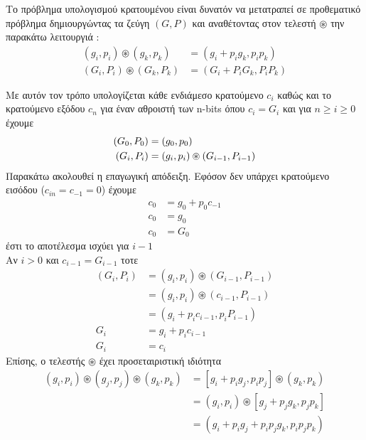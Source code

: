 Το πρόβλημα υπολογισμού κρατουμένου είναι δυνατόν να μετατραπεί σε
προθεματικό πρόβλημα δημιουργώντας τα ζεύγη $(G,P)$ και αναθέτοντας στον τελεστή
$\circledast$ την παρακάτω λειτουργιά :
\begin{equation}
\begin{split}
(g_i,p_i) \circledast (g_k,p_k) &= (g_i + p_ig_k , p_ip_k)\\
(G_i,P_i) \circledast (G_k,P_k) &= (G_i + P_iG_k , P_iP_k)
\end{split}
\end{equation}

Με αυτόν τον τρόπο υπολογίζεται κάθε ενδιάμεσο κρατούμενο $c_i$
καθώς και το κρατούμενο εξόδου $c_n$ για έναν αθροιστή των n-bits όπου $c_i = G_i$
και για $n \geq i \geq 0$ έχουμε 
\begin{equation}
\equationame{Αλγεβρικός ορισμός των $(G_i,P_i)$}
\begin{split}
(G_0,P_0) &= (g_0,p_0)\\
(G_i,P_i) &= (g_i,p_i) \circledast (G_{i-1},P_{i-1})
\end{split}
\end{equation}
Παρακάτω ακολουθεί η επαγωγική απόδειξη.
Εφόσον δεν υπάρχει κρατούμενο εισόδου ($c_{in} = c_{-1} = 0$) έχουμε 
\begin{equation*}
\begin{split}
    c_0 &= g_0 + p_0c_{-1} \\
    c_0 &= g_0 \\
    c_0 &= G_0
\end{split}
\end{equation*}
έστι το αποτέλεσμα ισχύει για $i-1$ \\
Αν $i>0$ και $c_{i-1} = G_{i-1}$ τοτε
\begin{equation*}
\begin{split} 
    (G_i,P_i)   &= (g_i,p_i) \circledast (G_{i-1},P_{i-1}) \\
                &= (g_i,p_i) \circledast (c_{i-1},P_{i-1}) \\
                &= (g_i + p_ic_{i-1} , p_iP_{i-1}) \\
            G_i &= g_i + p_ic_{i-1} \\
            G_i &= c_i
\end{split}
\end{equation*}
Επίσης, ο τελεστής $\circledast$ έχει προσεταιριστική ιδιότητα 
\begin{equation*}
\begin{split} 
    (g_i,p_i)\circledast(g_j,p_j)\circledast(g_k,p_k) &= [g_i + p_ig_j,p_ip_j]\circledast(g_k,p_k) \\
    &= (g_i,p_i)\circledast[g_j + p_jg_k,p_jp_k]\\
    &= ( g_i + p_ig_j + p_ip_jg_k , p_ip_jp_k )
\end{split}
\end{equation*}

